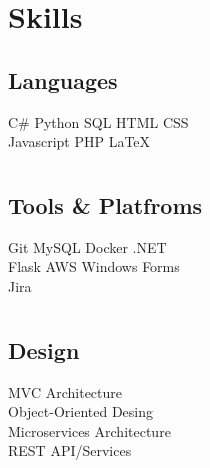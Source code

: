 \documentclass[]{farzad-resume}
\begin{document}
\begin{minipage}[t]{\textwidth}
\begin{minipage}[t]{0.33\textwidth}
\section{Skills}
\subsection{Languages}
C\# \textbullet{}  Python \textbullet{} SQL \textbullet {}  HTML\textbullet{} CSS \\ 
Javascript \textbullet{} PHP \textbullet{} \LaTeX\
\end{minipage}
\begin{minipage}[t]{0.33\textwidth}
\section{}
\subsection{Tools \& Platfroms}
Git \textbullet{}  MySQL \textbullet{} Docker \textbullet{} {\Large .}NET\\
Flask\textbullet{} AWS \textbullet{} Windows Forms\\
Jira
\end{minipage}
\begin{minipage}[t]{0.33\textwidth}
\section{}
\subsection{Design}
MVC Architecture \\ 
Object-Oriented Desing \\
Microservices Architecture \\ 
REST API/Services\\
\end{minipage}
%
%

\end{minipage}
\end{document}
